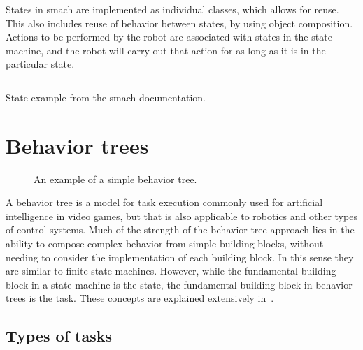 \documentclass[\rootfolder/main.tex]{subfiles}
\begin{document}
States in \acrshort{smach} are implemented as individual classes, which allows for reuse.
This also includes reuse of behavior between states, by using object composition.
Actions to be performed by the robot are associated with states in the state machine, and the robot will carry out that action for as long as it is in the particular state.

\begin{listing}
\inputminted{python}{\rootfolder/Chapters/Chapter2/Listings/smachstate.py}
\caption{State example from the \acrshort{smach} documentation.}
\end{listing}


\section{Behavior trees}

\begin{wrapfigure}{L}{0.5\columnwidth}
    \caption{An example of a simple behavior tree.}
    \label{fig:behaviortree}
\end{wrapfigure}

A behavior tree is a model for task execution commonly used for artificial intelligence in video games, but that is also applicable to robotics and other types of control systems.
Much of the strength of the behavior tree approach lies in the ability to compose complex behavior from simple building blocks, without needing to consider the implementation of each building block.
In this sense they are similar to finite state machines.
However, while the fundamental building block in a state machine is the state, the fundamental building block in behavior trees is the task.
These concepts are explained extensively in~\cite{Millington2009}.


\subsection{Types of tasks}
\end{document}
